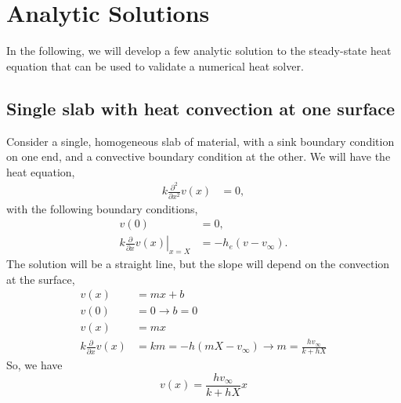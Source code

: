 \documentclass[letterpaper,12pt]{article}
\begin{document}
\section{Analytic Solutions}
In the following, we will develop a few analytic solution to the steady-state heat equation that can be used to validate a numerical heat solver.
\subsection{Single slab with heat convection at one surface}
Consider a single, homogeneous slab of material, with a sink boundary condition on one end, and a convective boundary condition at the other. We will have the heat equation,
\begin{align}
  k \frac{\partial^2}{\partial x^2} v(x) &= 0,
\end{align}
with the following boundary conditions,
\begin{align}
              v(0) &= 0, \\
  k \left. \frac{\partial}{\partial x} v(x) \right|_{x=X} &= -h_e \left( v - v_\infty \right).
\end{align}
The solution will be a straight line, but the slope will depend on the convection at the surface,
\begin{align}
  v(x) &= m x + b \\
  v(0) &= 0 \rightarrow b = 0\\
  v(x) &= m x \\
  k \frac{\partial}{\partial x} v(x) &= k m = -h \left( mX - v_\infty \right)
  \rightarrow
  m  = \frac{ h v_\infty }{ k + h X }
\end{align}
So, we have
\begin{equation}
  v(x) = \frac{ h v_\infty }{ k + h X } x
\end{equation}
\end{document}
